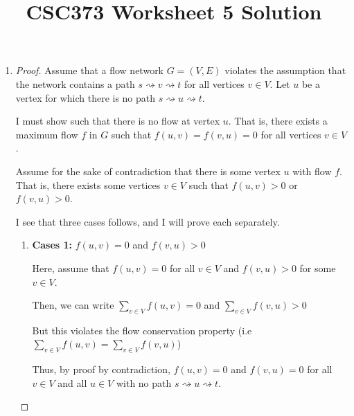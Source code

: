 \documentclass[12pt]{article}
\begin{document}
\title{CSC373 Worksheet 5 Solution}
\maketitle

\bigskip

\begin{enumerate}[1.]
    \item

    \bigskip

    \begin{proof}

    Assume that a flow network $G = (V,E)$ violates the assumption that the
    network contains a path $s \rightsquigarrow v \rightsquigarrow t$ for all
    vertices $v \in V$. Let $u$ be a vertex for which there is no path $s \rightsquigarrow u \rightsquigarrow t$.

    \bigskip

    I must show such that there is no flow at vertex $u$. That is, there exists a
    maximum flow $f$ in $G$ such that $f(u,v) = f(v,u) = 0$ for all vertices $v \in V$.

    \bigskip

    Assume for the sake of contradiction that there is some vertex $u$ with flow $f$.
    That is, there exists some vertices $v \in V$ such that $f(u,v) > 0$ or $f(v,u) > 0$.

    \bigskip

    I see that three cases follows, and I will prove each separately.

    \bigskip

    \begin{enumerate}[1.]
        \item \textbf{Cases 1:} $f(u,v) = 0$ and $f(v,u) > 0$

        \bigskip

        Here, assume that $f(u,v) = 0$ for all $v \in V$ and $f(v,u) > 0$ for some $v \in V$.

        \bigskip

        Then, we can write $\sum\limits_{v \in V} f(u,v) = 0$ and $\sum\limits_{v \in V} f(v,u) > 0$

        \bigskip

        But this violates the flow conservation property (i.e $\sum\limits_{v \in V} f(u,v) = \sum\limits_{v \in V} f(v,u)$)

        \bigskip

        Thus, by proof by contradiction, $f(u,v) = 0$ and $f(v,u) = 0$ for all $v \in V$ and
        all $u \in V$ with no path $s \rightsquigarrow u \rightsquigarrow t$.


\end{enumerate}
\end{proof}
\end{enumerate}
\end{document}

